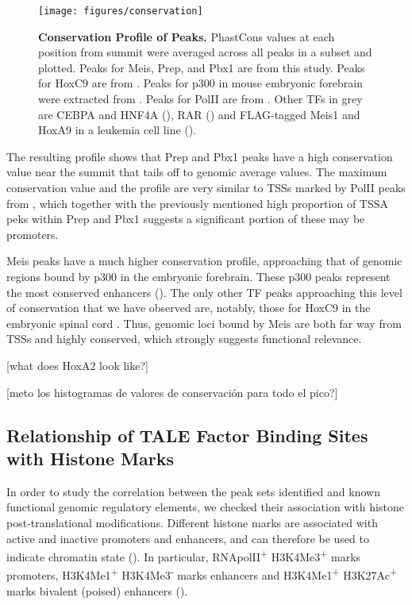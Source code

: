 \begin{figure}[]
  \centering
  \texttt{[image: figures/conservation]}
  \caption[Conservation Profile of Peaks]{\textbf{Conservation Profile of Peaks.} PhastCons values at each position from summit were averaged across all peaks in a subset and plotted. Peaks for Meis, Prep, and Pbx1 are from this study. Peaks for HoxC9 are from \cite{Jung2010}. Peaks for p300 in mouse embryonic forebrain were extracted from \cite{Blow2010}. Peaks for PolII are from \cite{Mahony2011}. Other TFs in grey are CEBPA and HNF4A (\cite{Schmidt2010}), RAR (\cite{Mahony2011}) and FLAG-tagged Meis1 and HoxA9 in a leukemia cell line (\cite{Huang2012}).}
  \label{fig:conservation}
\end{figure}

The resulting profile shows that Prep and Pbx1 peaks have a high conservation value near the summit that tails off to genomic average values. The maximum conservation value and the profile are very similar to \acp{TSS} marked by \ac{PolII} peaks from \cite{Mahony2011}, which together with the previously mentioned high proportion of \ac{TSSA} peks within Prep and Pbx1 suggests a significant portion of these may be promoters.

Meis peaks have a much higher conservation profile, approaching that of genomic regions bound by p300 in the embryonic forebrain. These p300 peaks represent the most conserved enhancers (\cite{Blow2010}). The only other \ac{TF} peaks approaching this level of conservation that we have observed are, notably, those for HoxC9 in the embryonic spinal cord \cite{Jung2010}. Thus, genomic loci bound by Meis are both far way from \acp{TSS} and highly conserved, which strongly suggests functional relevance.

[what does HoxA2 look like?] 

[meto los histogramas de valores de conservación para todo el pico?]

\subsection{Relationship of TALE Factor Binding Sites with Histone Marks}

In order to study the correlation between the peak sets identified and known functional genomic regulatory elements, we checked their association with histone post-translational modifications. Different histone marks are associated with active and inactive promoters and enhancers, and can therefore be used to indicate chromatin state (\cite{Mikkelsen2007}). In particular, RNApolII\textsuperscript{+} H3K4Me3\textsuperscript{+} marks promoters,  H3K4Me1\textsuperscript{+} H3K4Me3\textsuperscript{-} marks enhancers and H3K4Me1\textsuperscript{+} H3K27Ac\textsuperscript{+} marks bivalent (poised) enhancers (\cite{Creyghton2010}). 

